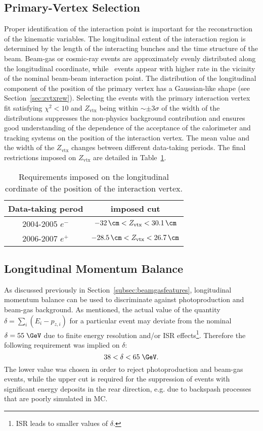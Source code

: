 \subsection{Primary-Vertex Selection}
\label{subsec:vtxselect}
Proper identification of the interaction point is important for the reconstruction of the kinematic variables. The longitudinal extent of the interaction region is determined by the length of the interacting bunches and the time structure of the beam. Beam-gas or cosmic-ray events are approximately evenly distributed along the longitudinal coordinate, while \ep\, events appear with higher rate in the vicinity of the nominal beam-beam interaction point. The distribution of the longitudinal component of the position of the primary vertex has a Gaussian-like shape (see Section~\ref{sec:zvtxrew}). Selecting the events with the primary interaction vertex fit satisfying $\chi^2 < 10$ and $Z_\text{vtx}$ being within $\sim \pm 3\sigma$ of the width of the distributions suppresses the non-physics background contribution and ensures good understanding of the dependence of the acceptance of the calorimeter and tracking systems on the position of the interaction vertex. The mean value and the width of the $Z_\text{vtx}$ changes between different data-taking periods. The final restrictions imposed on $Z_\text{vtx}$ are detailed in Table~\ref{tab:zvxcut}.
\begin{table}[htbp]
	\centering
		\begin{tabular}{|c|c|}
			\hline
			Data-taking perod & imposed cut \\
			\hline
			\hline
			2004-2005 $e^{-}$ & $-32\,\cm<Z_\text{vtx}<30.1\,\cm$ \\
			2006-2007 $e^{+}$ & $-28.5\,\cm<Z_\text{vtx}<26.7\,\cm$ \\
			\hline
		\end{tabular}
	\caption{Requirements imposed on the longitudinal cordinate of the position of the interaction vertex.}
	\label{tab:zvxcut}
\end{table}

\subsection{Longitudinal Momentum Balance}
\label{subsec:empzcut}
As discussed previously in Section~\ref{subsec:beamgasfeatures}, longitudinal momentum balance can be used to discriminate against photoproduction and beam-gas background. As mentioned, the actual value of the quantity $\delta=\sum_i{\left(E_i-p_{z,i}\right)}$ for a particular event may deviate from the nominal $\delta=55\;\GeV$ due to finite energy resolution and/or ISR effects\footnote{ISR leads to smaller values of $\delta$.}. Therefore the following requirement was implied on $\delta$:
\begin{equation}
38 < \delta < 65\;\GeV.
\label{eq:epmzcut}
\end{equation}
The lower value was chosen in order to reject photoproduction and beam-gas events, while the upper cut is required for the suppression of events with significant energy deposits in the rear direction, e.g. due to backspash processes that are poorly simulated in MC.

